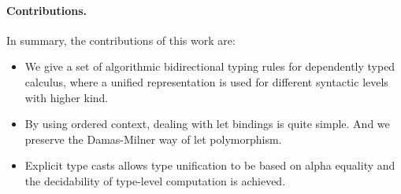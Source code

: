 \paragraph{Contributions.} In summary, the contributions of this work are:
\begin{itemize}
\item We give a set of algorithmic bidirectional typing rules for dependently typed calculus, where a unified representation is used for different syntactic levels with higher kind.
\item By using ordered context, dealing with let bindings is quite simple. And we preserve the Damas-Milner way of let polymorphism.
\item Explicit type casts allows type unification to be based on alpha equality and the decidability of type-level computation is achieved.
\end{itemize}
